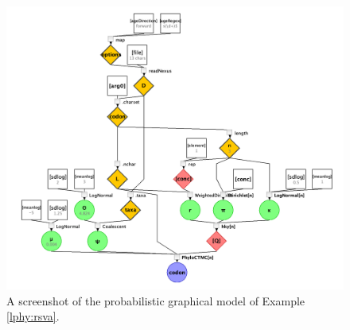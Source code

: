 \documentclass[12pt]{article} %
\begin{document}

\begin{figure}
  \includegraphics[width=\textwidth]{figs/RSV2.png}
  \caption{A screenshot of the probabilistic graphical model of Example \ref{lphy:rsva}.} 
  \label{fig:RSV2PGM}
\end{figure}


\clearpage


\bigskip












\end{document}
